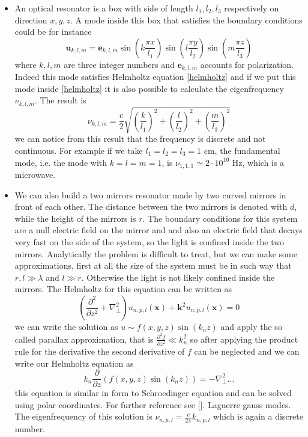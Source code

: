 \documentclass[12pt]{article}
\theoremstyle{plain}
\newcommand{\x}{\mathbf{x}}
\theoremstyle{definition}
\theoremstyle{remark}
\begin{document}
\begin{itemize}
\item An optical resonator is a box with side of length $l_1,l_2,l_3$ respectively on direction $x,y,z$. A mode inside this box that satisfies the boundary conditions could be for instance
\[\mathbf{u}_{k,l,m} = \mathbf{e}_{k,l,m} \sin\left(k\frac{\pi x}{l_1}\right)\sin\left(l\frac{\pi y}{l_2}\right)\sin\left(m\frac{\pi z}{l_3}\right)\]
where $k,l,m$ are three integer numbers and $\mathbf{e}_{k,l,m}$ accounts for polarization. Indeed this mode satisfies Helmholtz equation \eqref{helmholtz} and if we put this mode inside \eqref{helmholtz} it is also possible to calculate the eigenfrequency $\nu_{k,l,m}$. The result is
\[\nu_{k,l,m} = \frac{c}{2}\sqrt{\left(\frac{k}{l_1}\right)^2+\left(\frac{l}{l_2}\right)^2+\left(\frac{m}{l_3}\right)^2}\] 
we can notice from this result that the frequency is discrete and not continuous. For example if we take $l_1=l_2=l_3=1$ cm, the fundamental mode, i.e. the mode with $k=l=m=1$, is $\nu_{1,1,1}\simeq 2\cdot 10^{10}$ Hz, which is a microwave.
\item We can also build a two mirrors resonator made by two curved mirrors in front of each other. The distance between the two mirrors is denoted with $d$, while the height of the mirrors is $r$. The boundary conditions for this system are a null electric field on the mirror and and also an electric field that decays very fast on the side of the system, so the light is confined inside the two mirrors. Analytically the problem is difficult to treat, but we can make some approximations, first at all the size of the system must be in such way that $r,l \gg \lambda$ and $l\gg r$. Otherwise the light is not likely confined inside the mirrors. The Helmholtz for this equation can be written as
\[\left(\frac{\partial^2}{\partial z^2} + \nabla^2_\perp \right) u_{n,p,l}(\x) + \mathbf{k}^2 u_{n,p,l}(\x) =0\]
we can write the solution as $ u \sim f(x,y,z)\sin(k_n z) $ and apply the so called parallax approximation, that is $\frac{\partial^2f}{\partial z^2} \ll k_n^2$ so after applying the product rule for the derivative the second derivative of $f$ can be neglected and we can write our Helmholtz equation as
\[k_n\frac{\partial}{\partial z }(f(x,y,z)\sin(k_n z)) = -\nabla^2_\perp... \]
this equation is similar in form to Schroedinger equation and can be solved using polar coordinates. For further reference see []. Laguerre gauss modes.\\
The eigenfrequency of this solution is $\nu_{n,p,l} = \frac{c}{2\pi} k_{n,p,l}$ which is again a discrete number.
\end{itemize}
\end{document}

